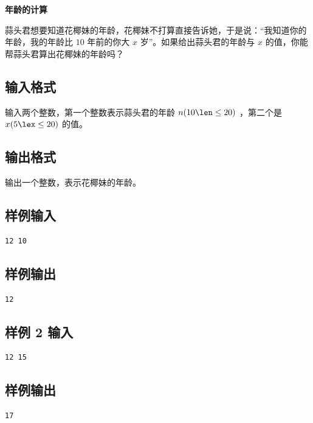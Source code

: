 \documentclass{article}
\newcommand{\problemname}[1]{\begin{center}\Large\bfseries #1\end{center}}
\begin{document}
\problemname{年龄的计算}

蒜头君想要知道花椰妹的年龄，花椰妹不打算直接告诉她，于是说：“我知道你的年龄，我的年龄比 $10$ 年前的你大 $x$ 岁”。如果给出蒜头君的年龄与 $x$ 的值，你能帮蒜头君算出花椰妹的年龄吗？

\subsection*{输入格式}
输入两个整数，第一个整数表示蒜头君的年龄 $n(10\len\le20)$ ，第二个是 $x(5\lex\le20)$ 的值。

\subsection*{输出格式}
输出一个整数，表示花椰妹的年龄。

\subsection*{样例输入}
\begin{verbatim}
12 10
\end{verbatim}

\subsection*{样例输出}
\begin{verbatim}
12
\end{verbatim}

\subsection*{样例 2 输入}
\begin{verbatim}
12 15
\end{verbatim}

\subsection*{样例输出}
\begin{verbatim}
17
\end{verbatim}
\end{document}
